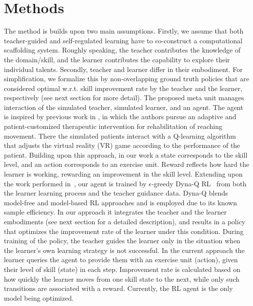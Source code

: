 \documentclass{article}
\begin{document}
\section{Methods}
The method is builds upon two main assumptions. Firstly, we assume that both teacher-guided and self-regulated learning have to co-construct a computational scaffolding system. Roughly speaking, the teacher contributes the knowledge of the domain/skill, and the learner  contributes the capability to explore their individual talents.   Secondly, teacher and learner differ in their embodiment.  For simplification, we  formalize this by non-overlapping ground truth policies that are considered optimal w.r.t. skill improvement rate by the teacher and the learner, respectively (see next section for more detail). 
The proposed meta unit manages interaction of the simulated teacher, simulated learner, and an agent. 
The agent is  inspired by previous work in \cite{nature}, in which the authors pursue an adaptive and patient-customized therapeutic intervention for rehabilitation of reaching movement. There the simulated patients interact with a Q-learning algorithm that adjusts the virtual reality (VR) game according to the performance of the patient. Building upon this approach, in our work  a state corresponds to the skill level, and an action corresponds to an exercise unit. Reward reflects how hard the learner is working,  rewarding an improvement in the skill level.  
Extending upon the work performed in~\cite{nature}, our agent is trained by $\epsilon$-greedy Dyna-Q RL~\cite{sutton} from both the learner learning process and the  teacher guidance data. Dyna-Q blends model-free and model-based RL approaches and is employed due to its  known sample efficiency.  In our approach it integrates the teacher and the learner embodiments (see next section for a detailed description), and results in a policy that optimizes the improvement  rate of the learner under this condition.  During training of the policy, the teacher guides the learner only in the situation when the learner's own learning strategy is not successful. 
In the current approach the learner queries the agent to provide them with an exercise unit (action), given their level of skill (state) in each step. 
Improvement rate is calculated based on how quickly the learner moves from one skill state to the next, while only such transitions are associated with a reward.  Currently, the RL agent is the only model being optimized. 
\end{document}
